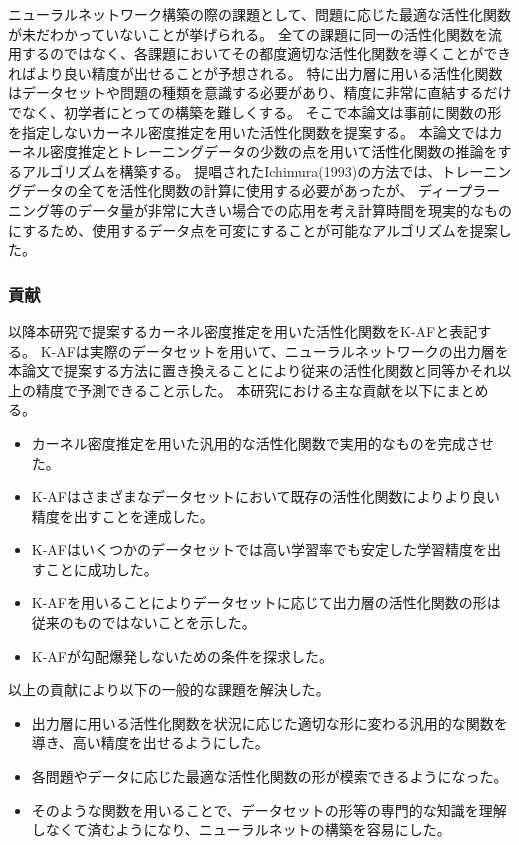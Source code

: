 ニューラルネットワーク構築の際の課題として、問題に応じた最適な活性化関数が未だわかっていないことが挙げられる。
全ての課題に同一の活性化関数を流用するのではなく、各課題においてその都度適切な活性化関数を導くことができればより良い精度が出せることが予想される。
特に出力層に用いる活性化関数はデータセットや問題の種類を意識する必要があり、精度に非常に直結するだけでなく、初学者にとっての構築を難しくする。
そこで本論文は事前に関数の形を指定しないカーネル密度推定を用いた活性化関数を提案する。
本論文ではカーネル密度推定とトレーニングデータの少数の点を用いて活性化関数の推論をするアルゴリズムを構築する。
提唱されたIchimura(1993)の方法では、トレーニングデータの全てを活性化関数の計算に使用する必要があったが、
ディープラーニング等のデータ量が非常に大きい場合での応用を考え計算時間を現実的なものにするため、使用するデータ点を可変にすることが可能なアルゴリズムを提案した。


\subsubsection{貢献}
\label{kouken}

以降本研究で提案するカーネル密度推定を用いた活性化関数をK-AFと表記する。
K-AFは実際のデータセットを用いて、ニューラルネットワークの出力層を本論文で提案する方法に置き換えることにより従来の活性化関数と同等かそれ以上の精度で予測できること示した。
本研究における主な貢献を以下にまとめる。

\begin{itemize}
  \item カーネル密度推定を用いた汎用的な活性化関数で実用的なものを完成させた。
  \item K-AFはさまざまなデータセットにおいて既存の活性化関数によりより良い精度を出すことを達成した。
  \item K-AFはいくつかのデータセットでは高い学習率でも安定した学習精度を出すことに成功した。
  \item K-AFを用いることによりデータセットに応じて出力層の活性化関数の形は従来のものではないことを示した。
  \item K-AFが勾配爆発しないための条件を探求した。
\end{itemize}

以上の貢献により以下の一般的な課題を解決した。

\begin{itemize}
  \item 出力層に用いる活性化関数を状況に応じた適切な形に変わる汎用的な関数を導き、高い精度を出せるようにした。
  \item 各問題やデータに応じた最適な活性化関数の形が模索できるようになった。
  \item そのような関数を用いることで、データセットの形等の専門的な知識を理解しなくて済むようになり、ニューラルネットの構築を容易にした。
\end{itemize}



